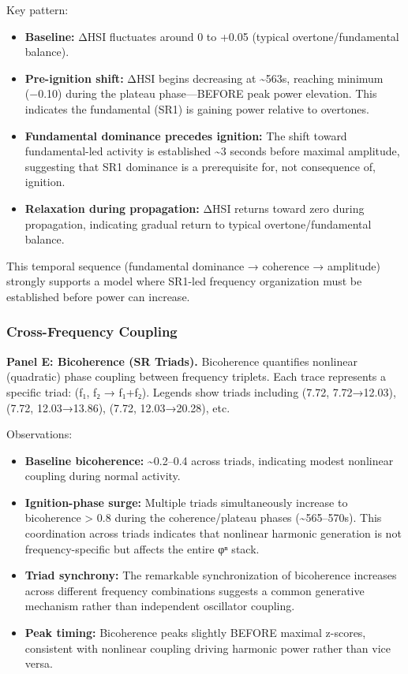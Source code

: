 \documentclass[11pt,a4paper]{article}
\begin{document}
Key pattern:
\begin{itemize}
\item \textbf{Baseline:} ΔHSI fluctuates around 0 to +0.05 (typical overtone/fundamental balance).
\item \textbf{Pre-ignition shift:} ΔHSI begins decreasing at \textasciitilde{}563s, reaching minimum (−0.10) during the plateau phase—BEFORE peak power elevation. This indicates the fundamental (SR1) is gaining power relative to overtones.
\item \textbf{Fundamental dominance precedes ignition:} The shift toward fundamental-led activity is established \textasciitilde{}3 seconds before maximal amplitude, suggesting that SR1 dominance is a prerequisite for, not consequence of, ignition.
\item \textbf{Relaxation during propagation:} ΔHSI returns toward zero during propagation, indicating gradual return to typical overtone/fundamental balance.
\end{itemize}

This temporal sequence (fundamental dominance → coherence → amplitude) strongly supports a model where SR1-led frequency organization must be established before power can increase.

\subsubsection{Cross-Frequency Coupling}

\textbf{Panel E: Bicoherence (SR Triads).}
Bicoherence quantifies nonlinear (quadratic) phase coupling between frequency triplets. Each trace represents a specific triad: (f₁, f₂ → f₁+f₂). Legends show triads including (7.72, 7.72→12.03), (7.72, 12.03→13.86), (7.72, 12.03→20.28), etc.

Observations:
\begin{itemize}
\item \textbf{Baseline bicoherence:} \textasciitilde{}0.2–0.4 across triads, indicating modest nonlinear coupling during normal activity.
\item \textbf{Ignition-phase surge:} Multiple triads simultaneously increase to bicoherence > 0.8 during the coherence/plateau phases (\textasciitilde{}565–570s). This coordination across triads indicates that nonlinear harmonic generation is not frequency-specific but affects the entire φⁿ stack.
\item \textbf{Triad synchrony:} The remarkable synchronization of bicoherence increases across different frequency combinations suggests a common generative mechanism rather than independent oscillator coupling.
\item \textbf{Peak timing:} Bicoherence peaks slightly BEFORE maximal z-scores, consistent with nonlinear coupling driving harmonic power rather than vice versa.
\end{itemize}
\end{document}
